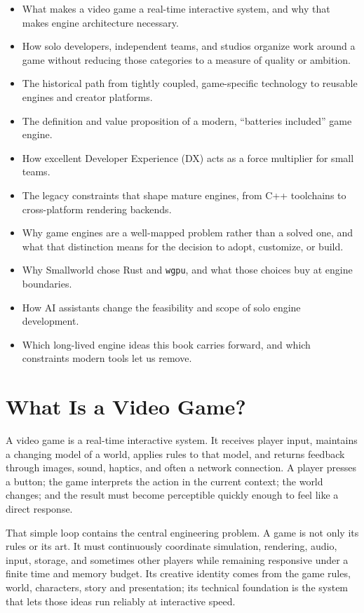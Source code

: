 \documentclass[
  11pt,
  letterpaper,
  DIV=11,
  numbers=noendperiod,
  twoside,
  open=right]{scrreprt}
\providecommand{\tightlist}{%
  \setlength{\itemsep}{0pt}\setlength{\parskip}{0pt}}
\begin{document}
\begin{itemize}
\tightlist
\item
  What makes a video game a real-time interactive system, and why that
  makes engine architecture necessary.
\item
  How solo developers, independent teams, and studios organize work
  around a game without reducing those categories to a measure of
  quality or ambition.
\item
  The historical path from tightly coupled, game-specific technology to
  reusable engines and creator platforms.
\item
  The definition and value proposition of a modern, ``batteries
  included'' game engine.
\item
  How excellent Developer Experience (DX) acts as a force multiplier for
  small teams.
\item
  The legacy constraints that shape mature engines, from C++ toolchains
  to cross-platform rendering backends.
\item
  Why game engines are a well-mapped problem rather than a solved one,
  and what that distinction means for the decision to adopt, customize,
  or build.
\item
  Why Smallworld chose Rust and \texttt{wgpu}, and what those choices
  buy at engine boundaries.
\item
  How AI assistants change the feasibility and scope of solo engine
  development.
\item
  Which long-lived engine ideas this book carries forward, and which
  constraints modern tools let us remove.
\end{itemize}

\section{What Is a Video Game?}\label{what-is-a-video-game}

A video game is a real-time interactive system. It receives player
input, maintains a changing model of a world, applies rules to that
model, and returns feedback through images, sound, haptics, and often a
network connection. A player presses a button; the game interprets the
action in the current context; the world changes; and the result must
become perceptible quickly enough to feel like a direct response.

That simple loop contains the central engineering problem. A game is not
only its rules or its art. It must continuously coordinate simulation,
rendering, audio, input, storage, and sometimes other players while
remaining responsive under a finite time and memory budget. Its creative
identity comes from the game rules, world, characters, story and
presentation; its technical foundation is the system that lets those
ideas run reliably at interactive speed.
\end{document}
